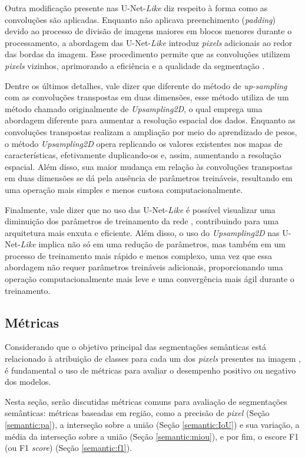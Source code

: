 Outra modificação presente nas U-Net-\textit{Like} diz respeito à forma como as convoluções são aplicadas. Enquanto \cite{Ronneberger2015U-net:Segmentation} não aplicava preenchimento (\textit{padding}) devido ao processo de divisão de imagens maiores em blocos menores durante o processamento, a abordagem das U-Net-\textit{Like} introduz \textit{pixels} adicionais ao redor das bordas da imagem. Esse procedimento permite que as convoluções utilizem \textit{pixels} vizinhos, aprimorando a eficiência e a qualidade da segmentação \citep{Pfister2019AutomatedNetworks}.

Dentre os últimos detalhes, vale dizer que diferente do método de \textit{up-sampling} com as convoluções transpostas em duas dimensões, esse método utiliza de um método chamado originalmente de \textit{Upsampling2D}, o qual emprega uma abordagem diferente para aumentar a resolução espacial dos dados. Enquanto as convoluções transpostas realizam a ampliação por meio do aprendizado de pesos, o método \textit{Upsampling2D} opera replicando os valores existentes nos mapas de características, efetivamente duplicando-os e, assim, aumentando a resolução espacial. Além disso, sua maior mudança em relação às convoluções transpostas em duas dimensões se dá pela ausência de parâmetros treináveis, resultando em uma operação mais simples e menos custosa computacionalmente.

Finalmente, vale dizer que no uso das U-Net-\textit{Like} é possível visualizar uma diminuição dos parâmetros de treinamento da rede \citep{Pfister2019AutomatedNetworks}, contribuindo para uma arquitetura mais enxuta e eficiente. Além disso, o uso do \textit{Upsampling2D} nas U-Net-\textit{Like} implica não só em uma redução de parâmetros, mas também em um processo de treinamento mais rápido e menos complexo, uma vez que essa abordagem não requer parâmetros treináveis adicionais, proporcionando uma operação computacionalmente mais leve e uma convergência mais ágil durante o treinamento.

\subsection{Métricas}
\label{semantic:metrics}
Considerando que o objetivo principal das segmentações semânticas está relacionado à atribuição de classes para cada um dos \textit{pixels} presentes na imagem \citep{Csurka2013}, é fundamental o uso de métricas para avaliar o desempenho positivo ou negativo dos modelos.

Nesta seção, serão discutidas métricas comuns para avaliação de segmentações semânticas: métricas baseadas em região, como a precisão de \textit{pixel} (Seção \ref{semantic:pa}), a interseção sobre a união (Seção \ref{semantic:IoU}) e sua variação, a média da interseção sobre a união (Seção \ref{semantic:miou}), e por fim, o escore F1 (ou F1 \textit{score}) (Seção \ref{semantic:f1}).



